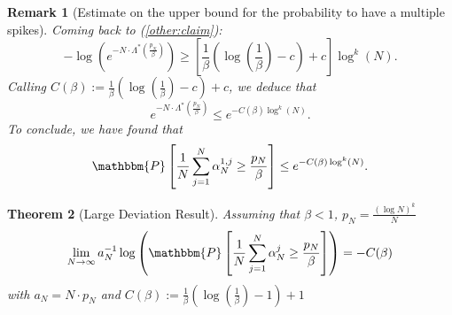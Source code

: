 \documentclass[11pt, a4paper]{article}
\newtheorem{theorem}{Theorem}
\newtheorem{remark}[theorem]{Remark}
\begin{document}
\begin{remark}[Estimate on the upper bound for the probability to have a multiple spikes]
Coming back to (\ref{other:claim}): \[ - \log \left( e^{- N \cdot \Lambda^*\left(\frac{p_N}{\beta}\right)} \right) \geq \left[ \frac{1}{\beta} \left( \log \left( \frac{1}{\beta} \right) - c \right) + c \right] \log^k(N). \]  Calling $C(\beta) := \frac{1}{\beta} \left( \log \left( \frac{1}{\beta} \right) - c \right) + c$, we deduce that \[ e^{- N \cdot \Lambda^*\left(\frac{p_N}{\beta}\right)} \leq e^{- C(\beta) \log^k(N)}. \]
To conclude, we have found that \[ \mathbbm{P} \left[ \frac{1}{N} \sum_{j = 1}^N \alpha^{1, j}_N \geq \frac{p_N}{\beta} \right] \leq e^{- C(\beta) \log^k(N)}. \]
\end{remark}
\begin{theorem}[Large Deviation Result]
Assuming that $\beta<1$, $p_N=\frac{(\log N)^k}{N}$
\[\lim_{N\rightarrow\infty}a^{-1}_N\log\left(\mathbbm{P} \left[ \frac{1}{N} \sum_{j = 1}^N \alpha^{j}_N \geq \frac{p_N}{\beta} \right]\right)=-C(\beta)\]
with $a_N=N\cdot p_N$ and $C(\beta) := \frac{1}{\beta} \left( \log \left( \frac{1}{\beta} \right) - 1 \right) + 1$
\end{theorem}
\end{document}
